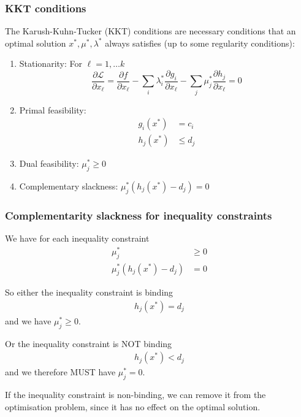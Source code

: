 \documentclass[10pt,aspectratio=169,dvipsnames]{beamer}
\def\l{\lambda}
\def\m{\mu}
\def\d{\partial}
\def\cL{\mathcal{L}}
\let\olditem\item
\renewcommand{\item}{%
\olditem\vspace{5pt}}
\begin{document}
\begin{frame}
  \frametitle{KKT conditions}

The \alert{Karush-Kuhn-Tucker (KKT) conditions} are necessary conditions that an optimal solution $x^*,\m^*,\l^*$ always satisfies (up to some regularity conditions):
\begin{enumerate}
\item \alert{Stationarity}: For $\ell = 1,\dots k$
  \begin{equation*}
  \frac{\d \cL}{\d x_\ell} =   \frac{\d f}{\d x_\ell} - \sum_i \l_i^* \frac{\d g_i}{\d x_\ell}  - \sum_j \m_j^* \frac{\d h_j}{\d x_\ell} = 0
  \end{equation*}
    \item \alert{Primal feasibility}:
      \begin{align*}
        g_i(x^*) & = c_i \\
        h_j(x^*) &\leq d_j
      \end{align*}
    \item \alert{Dual feasibility}: $\m_j^* \geq 0$
    \item \alert{Complementary slackness}: $\m_j^* (h_j(x^*) - d_j) = 0$
\end{enumerate}

\end{frame}





\begin{frame}
  \frametitle{Complementarity slackness for inequality constraints}


  We have for each inequality constraint
  \begin{align*}
    \m_j^* & \geq  0 \\
    \m_j^*(h_j(x^*) - d_j) & = 0
  \end{align*}

  So \alert{either} the inequality constraint is binding
  \begin{align*}
    h_j(x^*)  = d_j
  \end{align*}
  and we have $\m_j^* \geq 0$.

  \alert{Or} the inequality constraint is NOT binding
  \begin{align*}
    h_j(x^*)  < d_j
  \end{align*}
  and we therefore MUST have $\m_j^* = 0$.

  If the inequality constraint is non-binding, we can remove it from the optimisation problem, since it has no effect on the optimal solution.
\end{frame}
\end{document}
